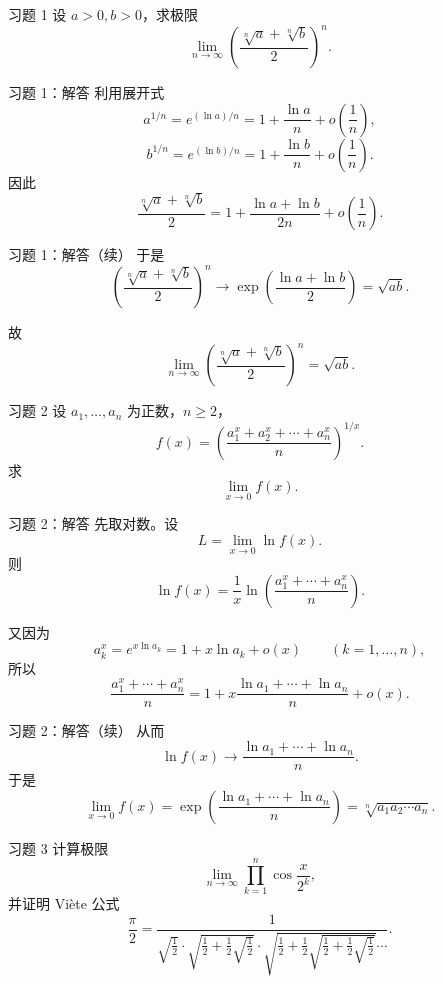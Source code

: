 ﻿\documentclass[aspectratio=169,11pt]{ctexbeamer}
\begin{document}
\begin{frame}{习题 1}
设 $a>0,b>0$，求极限
\[
  \lim_{n\to\infty}\left(\frac{\sqrt[n]{a}+\sqrt[n]{b}}{2}\right)^n.
\]
\end{frame}

\begin{frame}{习题 1：解答}
利用展开式
\[
  a^{1/n}=e^{(\ln a)/n}=1+\frac{\ln a}{n}+o\left(\frac1n\right),
\]
\[
  b^{1/n}=e^{(\ln b)/n}=1+\frac{\ln b}{n}+o\left(\frac1n\right).
\]
因此
\[
  \frac{\sqrt[n]{a}+\sqrt[n]{b}}{2}
  =
  1+\frac{\ln a+\ln b}{2n}+o\left(\frac1n\right).
\]
\end{frame}

\begin{frame}{习题 1：解答（续）}
于是
\[
  \left(\frac{\sqrt[n]{a}+\sqrt[n]{b}}{2}\right)^n
  \to
  \exp\left(\frac{\ln a+\ln b}{2}\right)
  =
  \sqrt{ab}.
\]

故
\[
  \lim_{n\to\infty}\left(\frac{\sqrt[n]{a}+\sqrt[n]{b}}{2}\right)^n=\sqrt{ab}.
\]
\end{frame}

\begin{frame}{习题 2}
设 $a_1,\dots,a_n$ 为正数，$n\ge 2$，
\[
  f(x)=\left(\frac{a_1^x+a_2^x+\cdots+a_n^x}{n}\right)^{1/x}.
\]
求
\[
  \lim_{x\to 0}f(x).
\]
\end{frame}

\begin{frame}{习题 2：解答}
先取对数。设
\[
  L=\lim_{x\to 0}\ln f(x).
\]
则
\[
  \ln f(x)=\frac1x\ln\left(\frac{a_1^x+\cdots+a_n^x}{n}\right).
\]

又因为
\[
  a_k^x=e^{x\ln a_k}=1+x\ln a_k+o(x)\qquad (k=1,\dots,n),
\]
所以
\[
  \frac{a_1^x+\cdots+a_n^x}{n}
  =
  1+x\frac{\ln a_1+\cdots+\ln a_n}{n}+o(x).
\]
\end{frame}

\begin{frame}{习题 2：解答（续）}
从而
\[
  \ln f(x)\to \frac{\ln a_1+\cdots+\ln a_n}{n}.
\]
于是
\[
  \lim_{x\to 0}f(x)
  =
  \exp\left(\frac{\ln a_1+\cdots+\ln a_n}{n}\right)
  =
  \sqrt[n]{a_1a_2\cdots a_n}.
\]
\end{frame}

\begin{frame}{习题 3}
计算极限
\[
  \lim_{n\to\infty}\prod_{k=1}^n\cos\frac{x}{2^k},
\]
并证明 Vi\`ete 公式
\[
  \frac{\pi}{2}
  =
  \frac{1}{
  \sqrt{\frac12}\cdot
  \sqrt{\frac12+\frac12\sqrt{\frac12}}\cdot
  \sqrt{\frac12+\frac12\sqrt{\frac12+\frac12\sqrt{\frac12}}}\cdots }.
\]
\end{frame}
\end{document}
